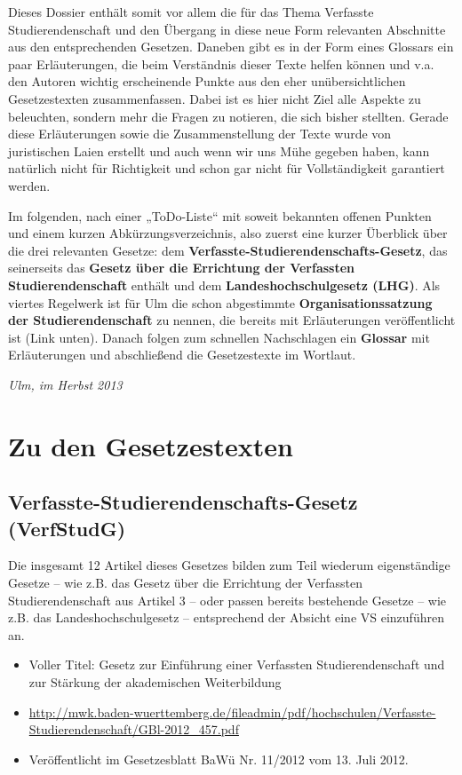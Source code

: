\documentclass[
10pt,
a4paper,
twoside,								%
titlepage=false,							%
draft=false								%
]{scrartcl}
\begin{document}
Dieses Dossier enthält somit vor allem die für das Thema Verfasste Studierendenschaft und den Übergang in diese neue Form relevanten Abschnitte aus den entsprechenden Gesetzen. Daneben gibt es in der Form eines Glossars ein paar Erläuterungen, die beim Verständnis dieser Texte helfen können und v.a. den Autoren wichtig erscheinende Punkte aus den eher unübersichtlichen Gesetzestexten zusammenfassen. Dabei ist es hier nicht Ziel alle Aspekte zu beleuchten, sondern mehr die Fragen zu notieren, die sich bisher stellten. Gerade diese Erläuterungen sowie die Zusammenstellung der Texte wurde von juristischen Laien erstellt und auch wenn wir uns Mühe gegeben haben, kann natürlich nicht für Richtigkeit und schon gar nicht für Vollständigkeit garantiert werden.

Im folgenden, nach einer „ToDo-Liste“ mit soweit bekannten offenen Punkten und einem kurzen Abkürzungsverzeichnis, also zuerst eine kurzer Überblick über die drei relevanten Gesetze: dem \textbf{Verfasste-Studierendenschafts-Gesetz}, das seinerseits das \textbf{Gesetz über die Errichtung der Verfassten Studierendenschaft} enthält und dem \textbf{Landeshochschulgesetz (LHG)}. 
Als viertes Regelwerk ist für Ulm die schon abgestimmte \textbf{Organisationssatzung der Studierendenschaft} zu nennen, die bereits mit Erläuterungen veröffentlicht ist (Link unten). Danach folgen zum schnellen Nachschlagen ein \textbf{Glossar} mit Erläuterungen und abschließend die Gesetzestexte im Wortlaut.

\begin{flushright}
	\textit{Ulm, im Herbst 2013}
\end{flushright}



\newpage
\section{Zu den Gesetzestexten}
\subsection{Verfasste-Studierendenschafts-Gesetz (VerfStudG)}

Die insgesamt 12 Artikel dieses Gesetzes bilden zum Teil wiederum eigenständige Gesetze – wie z.B. das Gesetz über die Errichtung der Verfassten Studierendenschaft aus Artikel 3 – oder passen bereits bestehende Gesetze – wie z.B. das Landeshochschulgesetz – entsprechend der Absicht eine VS einzuführen an.

\begin{itemize}
	\item Voller Titel: Gesetz zur Einführung einer Verfassten Studierendenschaft und zur Stärkung der akademischen Weiterbildung
	\item \sloppy \url{http://mwk.baden-wuerttemberg.de/fileadmin/pdf/hochschulen/Verfasste-Studierendenschaft/GBl-2012_457.pdf}
	\item Veröffentlicht im Gesetzesblatt BaWü Nr. 11/2012 vom 13. Juli 2012.
\end{itemize}
\end{document}

